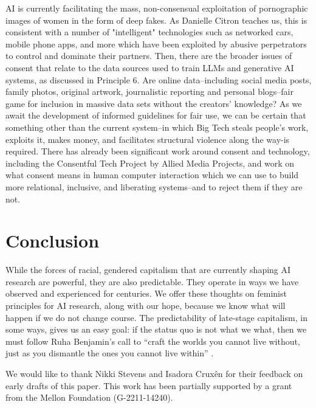 AI is currently facilitating the mass, non-consensual exploitation of pornographic images of women in the form of deep fakes. 
As Danielle Citron teaches us, this is consistent with a number of "intelligent" technologies such as networked cars, mobile phone apps, and more which have been exploited by abusive perpetrators to control and dominate their partners\cite{Citron2022-lx}. Then, there are the broader issues of consent that relate to the data sources used to train LLMs and generative AI systems, as discussed in Principle 6. Are online data–including social media posts, family photos, original artwork, journalistic reporting and personal blogs–fair game for inclusion in massive data sets without the creators' knowledge? As we await the development of informed guidelines for fair use, we can be certain that something other than the current system–in which Big Tech steals people's work, exploits it, makes money, and facilitates structural violence along the way-is required. There has already been significant work around consent and technology, including the Consentful Tech Project by Allied Media Projects, and work on what consent means in human computer interaction \cite{Im_Dimond_Berton_Lee_Mustelier_Ackerman_Gilbert_2021, Lee_Toliver_2017, Strengers_2021} which we can use to build more relational, inclusive, and liberating systems--and to reject them if they are not. 

\section{Conclusion}

While the forces of racial, gendered capitalism that are currently shaping AI research are powerful, they are also predictable. They operate in ways we have observed and experienced for centuries. We offer these thoughts on feminist principles for AI research, along with our hope, because we know what will happen if we do not change course. The predictability of late-stage capitalism, in some ways, gives us an easy goal: if the status quo is not what we what, then we must follow Ruha Benjamin's call to “craft the worlds you cannot live without, just as you dismantle the ones you cannot live within” \cite{Benjamin_2022}. 

\begin{acks}
We would like to thank Nikki Stevens and Isadora Cruxên for their feedback on early drafts of this paper. This work has been partially supported by a grant from the Mellon Foundation (G-2211-14240).
\end{acks}

